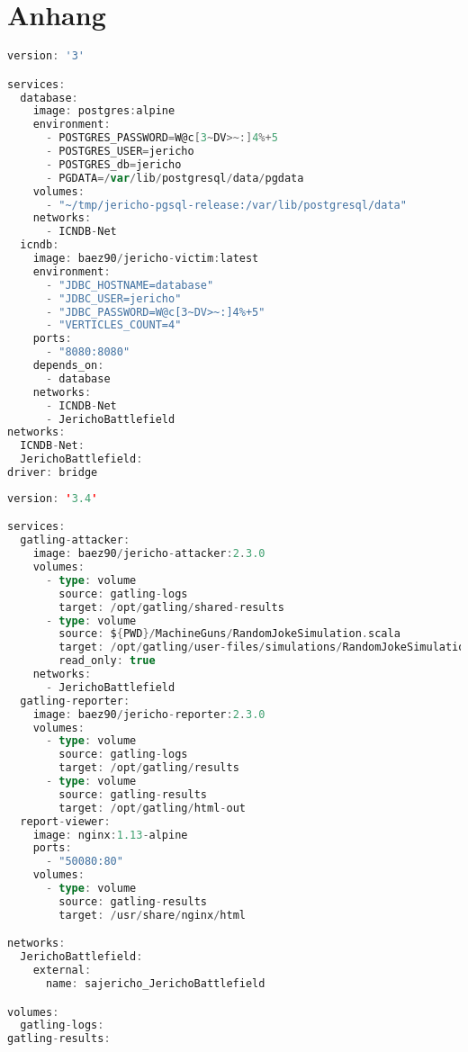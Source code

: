 \chapter{Anhang}

\begin{lstlisting}[frame=single,caption={Docker-Compose Datei f\"ur Demo-Anwendung}, label=lst:dockerComposeDemoApp, language=Scala]
version: '3'

services:
  database:
    image: postgres:alpine
    environment:
      - POSTGRES_PASSWORD=W@c[3~DV>~:]4%+5
      - POSTGRES_USER=jericho
      - POSTGRES_db=jericho
      - PGDATA=/var/lib/postgresql/data/pgdata
    volumes:
      - "~/tmp/jericho-pgsql-release:/var/lib/postgresql/data"
    networks:
      - ICNDB-Net
  icndb:
    image: baez90/jericho-victim:latest
    environment:
      - "JDBC_HOSTNAME=database"
      - "JDBC_USER=jericho"
      - "JDBC_PASSWORD=W@c[3~DV>~:]4%+5"
      - "VERTICLES_COUNT=4"
    ports:
      - "8080:8080"
    depends_on:
      - database
    networks:
      - ICNDB-Net
      - JerichoBattlefield
networks:
  ICNDB-Net:
  JerichoBattlefield:
driver: bridge
\end{lstlisting}

\newpage

\begin{lstlisting}[frame=single,caption={Docker-Compose Datei f\"ur Jericho}, label=lst:dockerComposeJericho, language=Scala]
version: '3.4'

services:
  gatling-attacker:
    image: baez90/jericho-attacker:2.3.0
    volumes:
      - type: volume
        source: gatling-logs
        target: /opt/gatling/shared-results
      - type: volume
        source: ${PWD}/MachineGuns/RandomJokeSimulation.scala
        target: /opt/gatling/user-files/simulations/RandomJokeSimulation.scala
        read_only: true
    networks:
      - JerichoBattlefield
  gatling-reporter:
    image: baez90/jericho-reporter:2.3.0
    volumes:
      - type: volume
        source: gatling-logs
        target: /opt/gatling/results
      - type: volume
        source: gatling-results
        target: /opt/gatling/html-out
  report-viewer:
    image: nginx:1.13-alpine
    ports:
      - "50080:80"
    volumes:
      - type: volume
        source: gatling-results
        target: /usr/share/nginx/html

networks:
  JerichoBattlefield:
    external:
      name: sajericho_JerichoBattlefield

volumes:
  gatling-logs:
gatling-results:
\end{lstlisting}

